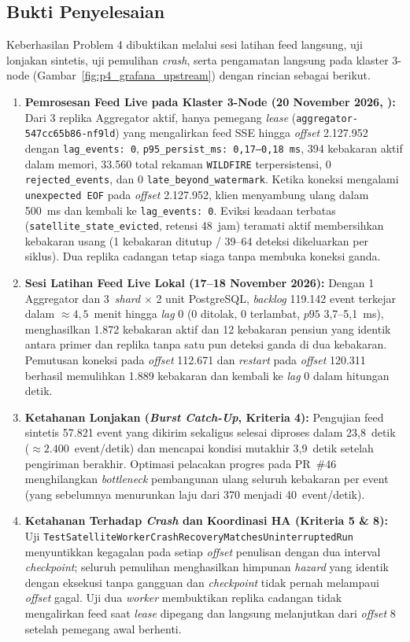 \subsection{Bukti Penyelesaian}
Keberhasilan Problem 4 dibuktikan melalui sesi latihan feed langsung, uji lonjakan sintetis, uji pemulihan \textit{crash}, serta pengamatan langsung pada klaster 3-node (Gambar~\ref{fig:p4_grafana_upstream}) dengan rincian sebagai berikut.
\begin{enumerate}
    \item \textbf{Pemrosesan Feed Live pada Klaster 3-Node (20 November 2026, ):} Dari 3 replika Aggregator aktif, hanya pemegang \textit{lease} (\texttt{aggregator-547cc65b86-nf9ld}) yang mengalirkan feed SSE hingga \textit{offset} 2.127.952 dengan \texttt{lag\_events: 0}, \texttt{p95\_persist\_ms: 0,17--0,18~ms}, 394 kebakaran aktif dalam memori, 33.560 total rekaman \texttt{WILDFIRE} terpersistensi, 0 \texttt{rejected\_events}, dan 0 \texttt{late\_beyond\_watermark}. Ketika koneksi mengalami \texttt{unexpected EOF} pada \textit{offset} 2.127.952, klien menyambung ulang dalam 500~ms dan kembali ke \texttt{lag\_events: 0}. Eviksi keadaan terbatas (\texttt{satellite\_state\_evicted}, retensi 48~jam) teramati aktif membersihkan kebakaran usang (1 kebakaran ditutup / 39--64 deteksi dikeluarkan per siklus). Dua replika cadangan tetap siaga tanpa membuka koneksi ganda.
    \item \textbf{Sesi Latihan Feed Live Lokal (17--18 November 2026):} Dengan 1 Aggregator dan 3~\textit{shard} $\times$ 2 unit PostgreSQL, \textit{backlog} 119.142 event terkejar dalam $\approx 4,5$~menit hingga \textit{lag} 0 (0 ditolak, 0 terlambat, $p95$ 3,7--5,1~ms), menghasilkan 1.872 kebakaran aktif dan 12 kebakaran pensiun yang identik antara primer dan replika tanpa satu pun deteksi ganda di dua kebakaran. Pemutusan koneksi pada \textit{offset} 112.671 dan \textit{restart} pada \textit{offset} 120.311 berhasil memulihkan 1.889 kebakaran dan kembali ke \textit{lag} 0 dalam hitungan detik.
    \item \textbf{Ketahanan Lonjakan (\textit{Burst Catch-Up}, Kriteria 4):} Pengujian feed sintetis 57.821 event yang dikirim sekaligus selesai diproses dalam 23,8~detik ($\approx 2.400$~event/detik) dan mencapai kondisi mutakhir 3,9~detik setelah pengiriman berakhir. Optimasi pelacakan progres pada PR~\#46 menghilangkan \textit{bottleneck} pembangunan ulang seluruh kebakaran per event (yang sebelumnya menurunkan laju dari 370 menjadi 40~event/detik).
    \item \textbf{Ketahanan Terhadap \textit{Crash} dan Koordinasi HA (Kriteria 5 \& 8):} Uji \texttt{TestSatelliteWorkerCrashRecoveryMatchesUninterruptedRun} menyuntikkan kegagalan pada setiap \textit{offset} penulisan dengan dua interval \textit{checkpoint}; seluruh pemulihan menghasilkan himpunan \textit{hazard} yang identik dengan eksekusi tanpa gangguan dan \textit{checkpoint} tidak pernah melampaui \textit{offset} gagal. Uji dua \textit{worker} membuktikan replika cadangan tidak mengalirkan feed saat \textit{lease} dipegang dan langsung melanjutkan dari \textit{offset} 8 setelah pemegang awal berhenti.
\end{enumerate}

